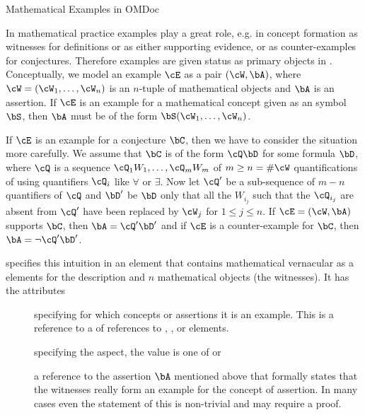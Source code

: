 \begin{omgroup}[short=Mathematical Statements,id=statements]
\begin{omgroup}[id=examples]{Mathematical Examples in OMDoc}
\begin{module}[id=examples]

In mathematical practice examples play a great role, e.g. in concept formation as
witnesses for definitions or as either supporting evidence, or as counter-examples for
conjectures.  Therefore examples are given status as primary objects in {\omdoc}.
Conceptually, we model an example $\cE$ as a pair $(\cW,\bA)$, where
$\cW=(\cW_1,\ldots,\cW_n)$ is an $n$-tuple of mathematical objects and $\bA$ is an
assertion. If $\cE$ is an example for a mathematical concept given as an {\omdoc} symbol
$\bS$, then $\bA$ must be of the form $\bS(\cW_1,\ldots,\cW_n)$.
  
If $\cE$ is an example for a conjecture $\bC$, then we have to consider the situation more
carefully. We assume that $\bC$ is of the form $\cQ\bD$ for some formula $\bD$, where
$\cQ$ is a sequence $\cQ_1W_1,\ldots,\cQ_mW_m$ of $m\geq n=\#\cW$ quantifications of using
quantifiers $\cQ_i$ like $\forall$ or $\exists$.  Now let $\cQ'$ be a sub-sequence of
$m-n$ quantifiers of $\cQ$ and $\bD'$ be $\bD$ only that all the $W_{i_j}$ such that the
$\cQ_{i_j}$ are absent from $\cQ'$ have been replaced by $\cW_j$ for $1\leq j\leq n$.  If
$\cE=(\cW,\bA)$ supports $\bC$, then $\bA=\cQ'\bD'$ and if $\cE$ is a counter-example for
$\bC$, then $\bA=\neg\cQ'\bD'$.
  
\begin{definition}[id=example.def]
  {\omdoc} specifies this intuition in an {} element that contains
  mathematical vernacular as a {} elements for the description and
  $n$ mathematical objects (the witnesses). It has the attributes
\begin{description}
\item[{}] specifying for which concepts or assertions
    it is an example.  This is a reference to a {} of {} references to {},
    {}, or {} elements.
\item[{}] specifying the aspect, the value is one of
  {} or {}
\item[{}] a reference to the assertion $\bA$
  mentioned above that formally states that the witnesses really form an example for the
  concept of assertion. In many cases even the statement of this is non-trivial
  and may require a proof.
\end{description}
\end{definition}


\end{module}
\end{omgroup}
\end{omgroup}
